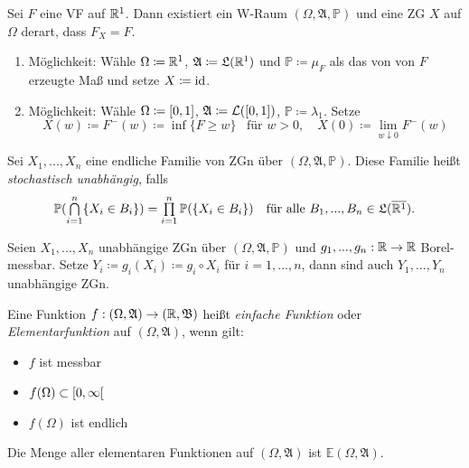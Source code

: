 \documentclass{cheat-sheet}
\newcommand{\Alg}{\mathfrak{A}} %
\newcommand{\LebAlg}{\mathfrak{L}} %
\renewcommand{\P}{\mathbb{P}} %
\newcommand{\E}{\mathbb{E}} %
\newcommand{\Bor}{\mathfrak{B}} %
\newcommand{\Leb}{\mathcal{L}} %
\renewcommand{\ER}{\overline{\R^1}} %
\begin{document}

\begin{satz}
  Sei $F$ eine VF auf $\mathbb{R}^1$. Dann existiert ein W-Raum $(\Omega, \Alg, \P)$ und eine ZG $X$ auf $\Omega$ derart, dass $F_X = F$.
\end{satz}

\begin{beweis}
  \begin{enumerate}
    \item Möglichkeit: Wähle $\Omega \coloneqq \mathbb{R}^1$, $\Alg \coloneqq \LebAlg(\R^1)$ und $\P \coloneqq \mu_F$ als das von von $F$ erzeugte Maß und setze $X \coloneqq \mathrm{id}$.
    \item Möglichkeit: Wähle $\Omega \coloneqq \left[ 0, 1 \right]$, $\Alg \coloneqq \Leb(\cinterval{0}{1})$, $\P \coloneqq \lambda_1$. Setze
    \[
      X(w) \coloneqq F^{-}(w) \coloneqq \inf \{ F \geq w \} \enspace \text{ für } w > 0, \quad
      X(0) \coloneqq \lim_{w \downarrow 0} F^{-}(w)
    \]
  \end{enumerate}
\end{beweis}




\begin{defn}
  Sei $X_1, ..., X_n$ eine endliche Familie von ZGn über $(\Omega, \Alg, \P)$. Diese Familie heißt \emph{stochastisch unabhängig}, falls
  \[ \P(\bigcap_{i=1}^n \{ X_i \in B_i \}) = \prod_{i=1}^n \P(\{ X_i \in B_i \}) \quad \text{für alle $B_1, ..., B_n \in \LebAlg(\ER)$.} \]
\end{defn}

\begin{satz}
  Seien $X_1, ..., X_n$ unabhängige ZGn über $(\Omega, \Alg, \P)$ und $g_1, ..., g_n : \mathbb{R} \to \mathbb{R}$ Borel-messbar. Setze $Y_i \coloneqq g_i(X_i) \coloneqq g_i \circ X_i$ für $i = 1, ..., n$, dann sind auch $Y_1, ..., Y_n$ unabhängige ZGn.
\end{satz}


\begin{defn}
  Eine Funktion $f : (\Omega, \Alg) \to (\R, \Bor)$ heißt \emph{einfache Funktion} oder \emph{Elementarfunktion} auf $(\Omega, \Alg)$, wenn gilt:
  \begin{multicols}{3}
    \begin{itemize}
      \item $f$ ist messbar
      \item $f(\Omega) \subset \left[ 0, \infty \right[$
      \item $f(\Omega)$ ist endlich
    \end{itemize}
  \end{multicols}
  Die Menge aller elementaren Funktionen auf $(\Omega, \Alg)$ ist $\E(\Omega, \Alg)$.
\end{defn}
\end{document}
